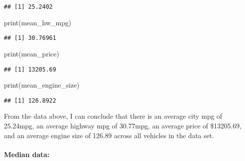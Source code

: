\documentclass[
]{article}
\newenvironment{Shaded}{\begin{snugshade}}{\end{snugshade}}
\newcommand{\AttributeTok}[1]{\textcolor[rgb]{0.77,0.63,0.00}{#1}}
\newcommand{\ConstantTok}[1]{\textcolor[rgb]{0.00,0.00,0.00}{#1}}
\newcommand{\FunctionTok}[1]{\textcolor[rgb]{0.00,0.00,0.00}{#1}}
\newcommand{\NormalTok}[1]{#1}
\newcommand{\OtherTok}[1]{\textcolor[rgb]{0.56,0.35,0.01}{#1}}
\newcommand{\SpecialCharTok}[1]{\textcolor[rgb]{0.00,0.00,0.00}{#1}}
\newcommand{\StringTok}[1]{\textcolor[rgb]{0.31,0.60,0.02}{#1}}
\begin{document}
\begin{verbatim}
## [1] 25.2402
\end{verbatim}

\begin{Shaded}
\begin{Highlighting}[]
\FunctionTok{print}\NormalTok{(mean\_hw\_mpg)}
\end{Highlighting}
\end{Shaded}

\begin{verbatim}
## [1] 30.76961
\end{verbatim}

\begin{Shaded}
\begin{Highlighting}[]
\FunctionTok{print}\NormalTok{(mean\_price)}
\end{Highlighting}
\end{Shaded}

\begin{verbatim}
## [1] 13205.69
\end{verbatim}

\begin{Shaded}
\begin{Highlighting}[]
\FunctionTok{print}\NormalTok{(mean\_engine\_size)}
\end{Highlighting}
\end{Shaded}

\begin{verbatim}
## [1] 126.8922
\end{verbatim}

From the data above, I can conclude that there is an average city mpg of
25.24mpg, an average highway mpg of 30.77mpg, an average price of
\$13205.69, and an average engine size of 126.89 across all vehicles in
the data set. \n

\hypertarget{median-data}{%
\paragraph{Median data:}\label{median-data}}

\begin{Shaded}
\end{Shaded}
\end{document}
